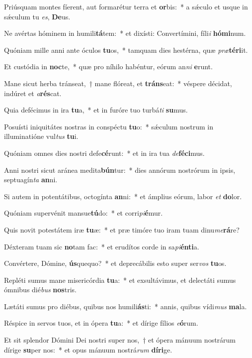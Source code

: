 \item Priúsquam montes fíerent, aut formarétur terra et \textbf{or}bis:~* a sǽculo et usque in sǽculum tu \textit{es}, \textbf{De}us.
\item Ne avértas hóminem in humili\textbf{tá}tem:~* et dixísti: Convertímini, fíli\textit{i} \textbf{hó}\textbf{mi}num.
\item Quóniam mille anni ante óculos \textbf{tu}os,~* tamquam dies hestérna, quæ \textit{præ}\textbf{tér}\textbf{i}it.
\item Et custódia in \textbf{noc}te,~* quæ pro níhilo habéntur, eórum an\textit{ni} \textbf{e}runt.
\item Mane sicut herba tránseat,~† mane flóreat, et \textbf{tráns}eat:~* véspere décidat, indúret et \textit{a}\textbf{rés}cat.
\item Quia defécimus in ira \textbf{tu}a,~* et in furóre tuo turbá\textit{ti} \textbf{su}mus.
\item Posuísti iniquitátes nostras in conspéctu \textbf{tu}o:~* sǽculum nostrum in illuminatióne vul\textit{tus} \textbf{tu}i.
\item Quóniam omnes dies nostri defe\textbf{cé}runt:~* et in ira tua \textit{de}\textbf{fé}\textbf{ci}mus.
\item Anni nostri sicut aránea medita\textbf{bún}tur:~* dies annórum nostrórum in ipsis, septuagín\textit{ta} \textbf{an}ni.
\item Si autem in potentátibus, octogínta \textbf{an}ni:~* et ámplius eórum, labor \textit{et} \textbf{do}lor.
\item Quóniam supervénit mansue\textbf{tú}do:~* et corri\textit{pi}\textbf{é}mur.
\item Quis novit potestátem iræ \textbf{tu}æ:~* et præ timóre tuo iram tuam dinu\textit{me}\textbf{rá}re?
\item Déxteram tuam sic \textbf{no}tam fac:~* et erudítos corde in sa\textit{pi}\textbf{én}\textbf{ti}a.
\item Convértere, Dómine, \textbf{ús}quequo?~* et deprecábilis esto super ser\textit{vos} \textbf{tu}os.
\item Repléti sumus mane misericórdia \textbf{tu}a:~* et exsultávimus, et delectáti sumus ómnibus dié\textit{bus} \textbf{nos}tris.
\item Lætáti sumus pro diébus, quibus nos humili\textbf{ás}ti:~* annis, quibus vídi\textit{mus} \textbf{ma}la.
\item Réspice in servos tuos, et in ópera \textbf{tu}a:~* et dírige fílios \textit{e}\textbf{ó}rum.
\item Et sit splendor Dómini Dei nostri super nos,~† et ópera mánuum nostrárum dírige \textbf{su}per nos:~* et opus mánuum nostrá\textit{rum} \textbf{dí}\textbf{ri}ge.
